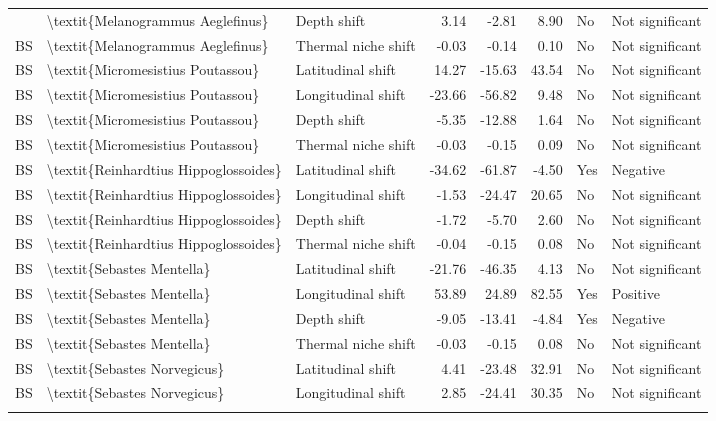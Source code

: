\begin{longtable}[t]{lllrrrll}
{{BS & \textbackslash{}textit\{Melanogrammus Aeglefinus\} & Depth shift & 3.14 & -2.81 & 8.90 & No & Not significant\\
BS & \textbackslash{}textit\{Melanogrammus Aeglefinus\} & Thermal niche shift & -0.03 & -0.14 & 0.10 & No & Not significant\\
BS & \textbackslash{}textit\{Micromesistius Poutassou\} & Latitudinal shift & 14.27 & -15.63 & 43.54 & No & Not significant\\
BS & \textbackslash{}textit\{Micromesistius Poutassou\} & Longitudinal shift & -23.66 & -56.82 & 9.48 & No & Not significant\\
\addlinespace
BS & \textbackslash{}textit\{Micromesistius Poutassou\} & Depth shift & -5.35 & -12.88 & 1.64 & No & Not significant\\
BS & \textbackslash{}textit\{Micromesistius Poutassou\} & Thermal niche shift & -0.03 & -0.15 & 0.09 & No & Not significant\\
BS & \textbackslash{}textit\{Reinhardtius Hippoglossoides\} & Latitudinal shift & -34.62 & -61.87 & -4.50 & Yes & Negative\\
BS & \textbackslash{}textit\{Reinhardtius Hippoglossoides\} & Longitudinal shift & -1.53 & -24.47 & 20.65 & No & Not significant\\
BS & \textbackslash{}textit\{Reinhardtius Hippoglossoides\} & Depth shift & -1.72 & -5.70 & 2.60 & No & Not significant\\
\addlinespace
BS & \textbackslash{}textit\{Reinhardtius Hippoglossoides\} & Thermal niche shift & -0.04 & -0.15 & 0.08 & No & Not significant\\
BS & \textbackslash{}textit\{Sebastes Mentella\} & Latitudinal shift & -21.76 & -46.35 & 4.13 & No & Not significant\\
BS & \textbackslash{}textit\{Sebastes Mentella\} & Longitudinal shift & 53.89 & 24.89 & 82.55 & Yes & Positive\\
BS & \textbackslash{}textit\{Sebastes Mentella\} & Depth shift & -9.05 & -13.41 & -4.84 & Yes & Negative\\
BS & \textbackslash{}textit\{Sebastes Mentella\} & Thermal niche shift & -0.03 & -0.15 & 0.08 & No & Not significant\\
\addlinespace
BS & \textbackslash{}textit\{Sebastes Norvegicus\} & Latitudinal shift & 4.41 & -23.48 & 32.91 & No & Not significant\\
BS & \textbackslash{}textit\{Sebastes Norvegicus\} & Longitudinal shift & 2.85 & -24.41 & 30.35 & No & Not significant\\
}}
\end{longtable}
